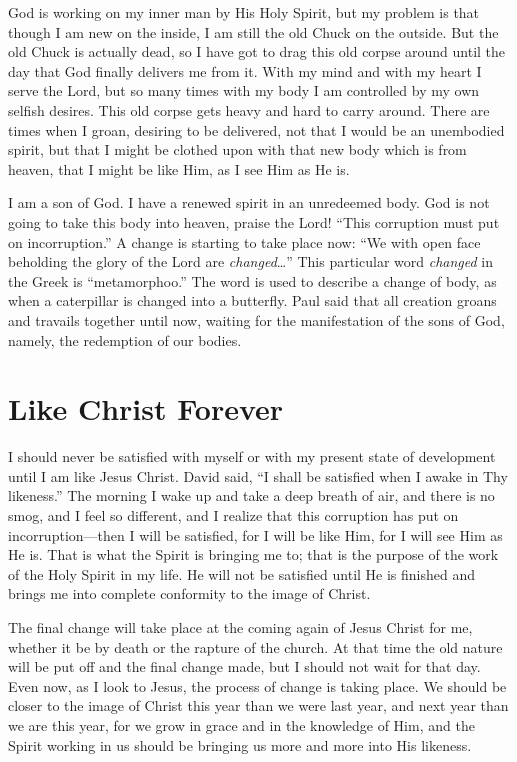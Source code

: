 God is working on my inner man by His Holy Spirit, but
my problem is that though I am new on the inside, I am still
the old Chuck on the outside. But the old Chuck is actually
dead, so I have got to drag this old corpse around until the
day that God finally delivers me from it. With my mind and
with my heart I serve the Lord, but so many times with my
body I am controlled by my own selfish desires. This old
corpse gets heavy and hard to carry around. There are times
when I groan, desiring to be delivered, not that I would be
an unembodied spirit, but that I might be clothed upon with
that new body which is from heaven, that I might be like
Him, as I see Him as He is.

I am a son of God. I have a renewed spirit in an unredeemed
body. God is not going to take this body into
heaven, praise the Lord! “This corruption must put on incorruption.”
A change is starting to take place now: “We with
open face beholding the glory of the Lord are \emph{changed}…”
This particular word \emph{changed} in the Greek is “metamorphoo.”
The word is used to describe a change of body, as when a
caterpillar is changed into a butterfly. Paul said that all creation
groans and travails together until now, waiting for the
manifestation of the sons of God, namely, the redemption of
our bodies.


\section*{Like Christ Forever}

I should never be satisfied with myself or with my present
state of development until I am like Jesus Christ. David
said, “I shall be satisfied when I awake in Thy likeness.” The
morning I wake up and take a deep breath of air, and there
is no smog, and I feel so different, and I realize that this corruption
has put on incorruption—then I will be satisfied, for
I will be like Him, for I will see Him as He is. That is what
the Spirit is bringing me to; that is the purpose of the work
of the Holy Spirit in my life. He will not be satisfied until He
is finished and brings me into complete conformity to the
image of Christ.

The final change will take place at the coming again of
Jesus Christ for me, whether it be by death or the rapture of
the church. At that time the old nature will be put off and
the final change made, but I should not wait for that day.
Even now, as I look to Jesus, the process of change is taking
place. We should be closer to the image of Christ this year
than we were last year, and next year than we are this year,
for we grow in grace and in the knowledge of Him, and the
Spirit working in us should be bringing us more and more
into His likeness.


